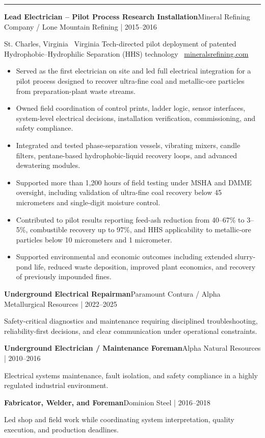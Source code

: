 \documentclass[10pt,letterpaper]{article}
\newcommand{\sectiontitle}[1]{\vspace{0.65em}{\large\bfseries\color{accent}#1}\par\vspace{0.12em}\hrule\vspace{0.35em}}
\newcommand{\role}[2]{\textbf{#1}\hfill\textcolor{muted}{#2}\par}
\begin{document}
\sectiontitle{Professional Engineering Experience}
\role{Lead Electrician -- Pilot Process Research Installation}{Mineral Refining Company / Lone Mountain Refining | 2015--2016}
St. Charles, Virginia \textbar\ Virginia Tech-directed pilot deployment of patented Hydrophobic--Hydrophilic Separation (HHS) technology \textbar\ \href{https://mineralsrefining.com}{mineralsrefining.com}
\begin{itemize}
    \item Served as the first electrician on site and led full electrical integration for a pilot process designed to recover ultra-fine coal and metallic-ore particles from preparation-plant waste streams.
    \item Owned field coordination of control prints, ladder logic, sensor interfaces, system-level electrical decisions, installation verification, commissioning, and safety compliance.
    \item Integrated and tested phase-separation vessels, vibrating mixers, candle filters, pentane-based hydrophobic-liquid recovery loops, and advanced dewatering modules.
    \item Supported more than 1,200 hours of field testing under MSHA and DMME oversight, including validation of ultra-fine coal recovery below 45 micrometers and single-digit moisture control.
    \item Contributed to pilot results reporting feed-ash reduction from 40--67\% to 3--5\%, combustible recovery up to 97\%, and HHS applicability to metallic-ore particles below 10 micrometers and 1 micrometer.
    \item Supported environmental and economic outcomes including extended slurry-pond life, reduced waste deposition, improved plant economics, and recovery of previously impounded fines.
\end{itemize}

\role{Underground Electrical Repairman}{Paramount Contura / Alpha Metallurgical Resources | 2022--2025}
Safety-critical diagnostics and maintenance requiring disciplined troubleshooting, reliability-first decisions, and clear communication under operational constraints.

\role{Underground Electrician / Maintenance Foreman}{Alpha Natural Resources | 2010--2016}
Electrical systems maintenance, fault isolation, and safety compliance in a highly regulated industrial environment.

\role{Fabricator, Welder, and Foreman}{Dominion Steel | 2016--2018}
Led shop and field work while coordinating system interpretation, quality execution, and production deadlines.
\end{document}
